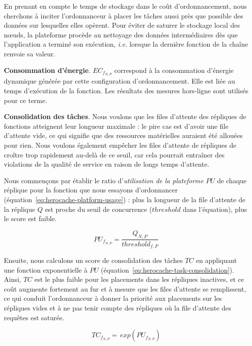 En prenant en compte le temps de stockage dans le coût d'ordonnancement, nous cherchons à inciter l'ordonnanceur à placer les tâches aussi près que possible des données sur lesquelles elles opèrent. Pour éviter de saturer le stockage local des nœuds, la plateforme procède au nettoyage des données intermédiaires dès que l'application a terminé son exécution, \textit{i.e.} lorsque la dernière fonction de la chaîne renvoie sa valeur.

\textbf{Consommation d'énergie}. ${EC}_{{f}_{N, P}}$ correspond à la consommation d'énergie dynamique générée par cette configuration d'ordonnancement. Elle est liée au temps d'exécution de la fonction. Les résultats des mesures hors-ligne sont utilisés pour ce terme.

\textbf{Consolidation des tâches}. Nous voulons que les files d'attente des répliques de fonctions atteignent leur longueur maximale : le pire cas est d'avoir une file d'attente vide, ce qui signifie que des ressources matérielles auraient été allouées pour rien. Nous voulons également empêcher les files d'attente de répliques de croître trop rapidement au-delà de ce seuil, car cela pourrait entraîner des violations de la qualité de service en raison de longs temps d'attente.

Nous commençons par établir le ratio d'\textit{utilisation de la plateforme} $PU$ de chaque réplique pour la fonction que nous essayons d'ordonnancer (équation~\ref{eq:herocache-platform-usage}) : plus la longueur de la file d'attente de la réplique $Q$ est proche du seuil de concurrence ($threshold$ dans l'équation), plus le score est faible. 

\begin{equation}
    PU_{f_{N, P}} = \frac{Q_{N, P}}{threshold_{f, P}}
\label{eq:herocache-platform-usage}
\end{equation}

Ensuite, nous calculons un score de consolidation des tâches $TC$ en appliquant une fonction exponentielle à $PU$ (équation~\ref{eq:herocache-task-consolidation}). Ainsi, $TC$ est le plus faible pour les placements dans les répliques inactives, et ce coût augmente fortement au fur et à mesure que les files d'attente se remplissent, ce qui conduit l'ordonnanceur à donner la priorité aux placements sur les répliques vides et à ne pas tenir compte des répliques où la file d'attente des requêtes est saturée.

\begin{equation}
    TC_{{f}_{N, P}} = \, exp(PU_{f_{N, P}})
\label{eq:herocache-task-consolidation}
\end{equation}

